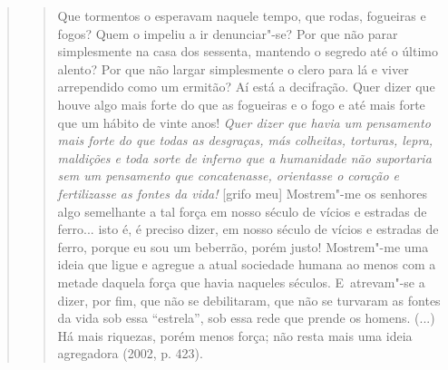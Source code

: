 {\begin{quote}
\begin{quote}
Que tormentos o esperavam naquele tempo, que rodas, fogueiras e fogos?
Quem o impeliu a ir denunciar"-se? Por que não parar simplesmente na casa
dos sessenta, mantendo o segredo até o último alento? Por que não largar
simplesmente o clero para lá e viver arrependido como um ermitão? Aí
está a decifração. Quer dizer que houve algo mais forte do que as
fogueiras e o fogo e até mais forte que um hábito de vinte anos!
\emph{Quer dizer que havia um pensamento mais forte do que todas as
desgraças, más colheitas, torturas, lepra, maldições e toda sorte de
inferno que a humanidade não suportaria sem um pensamento que
concatenasse, orientasse o coração e fertilizasse as fontes da vida!}
{[}grifo meu{]} Mostrem"-me os senhores algo semelhante a tal força em
nosso século de vícios e estradas de ferro... isto é, é preciso dizer,
em nosso século de vícios e estradas de ferro, porque eu sou um
beberrão, porém justo! Mostrem"-me uma ideia que ligue e agregue a atual
sociedade humana ao menos com a metade daquela força que havia naqueles
séculos. E~atrevam"-se a dizer, por fim, que não se debilitaram, que não
se turvaram as fontes da vida sob essa ``estrela'', sob essa rede que
prende os homens. (...) Há mais riquezas, porém menos força; não resta
mais uma ideia agregadora (2002, p. 423).
\end{quote}


\end{quote}}
